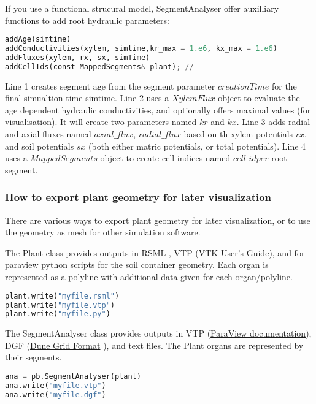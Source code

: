If you use a functional strucural model, SegmentAnalyser offer auxilliary functions to add root hydraulic parameters:
\begin{lstlisting}[language=Python]
addAge(simtime) 
addConductivities(xylem, simtime,kr_max = 1.e6, kx_max = 1.e6)
addFluxes(xylem, rx, sx, simTime)
addCellIds(const MappedSegments& plant); // 
\end{lstlisting}
Line 1 creates segment age from the segment parameter $creationTime$ for the final simualtion time simtime. Line 2 uses a $XylemFlux$ object to evaluate the age dependent hydraulic conductivities, and optionally offers maximal values (for visualisation). It will create two parameters named $kr$ and $kx$.  Line 3 adds radial and axial fluxes named  $axial\_flux$, $radial\_flux$ based on th xylem potentials $rx$, and soil potentials $sx$ (both either matric potentials, or total potentials). Line 4 uses a $MappedSegments$ object to create cell indices named $cell\_id per$ root segment. 


\subsubsection*{How to export plant geometry for later visualization} \label{ssec:export}

There are various ways to export plant geometry for later visualization, or to use the geometry as mesh for other simulation software.

The Plant class provides outputs in RSML \citep{lobet2015root}, VTP (\href{https://vtk.org/vtk-users-guide/}{VTK User's Guide}), and for paraview python scripts for the soil container geometry. Each organ is represented as a polyline with additional data given for each organ/polyline.

\begin{lstlisting}[language=Python]
plant.write("myfile.rsml")
plant.write("myfile.vtp")
plant.write("myfile.py")
\end{lstlisting}

The SegmentAnalyser class provides outputs in VTP (\href{https://docs.paraview.org/en/latest/ReferenceManual/index.html}{ParaView documentation}), DGF (\href{https://dune-project.org/doxygen/2.4.1/group__DuneGridFormatParser.html}{Dune Grid Format} ), and text files. The Plant organs are represented by their segments.
\begin{lstlisting}[language=Python]
ana = pb.SegmentAnalyser(plant)
ana.write("myfile.vtp")
ana.write("myfile.dgf")
\end{lstlisting}


